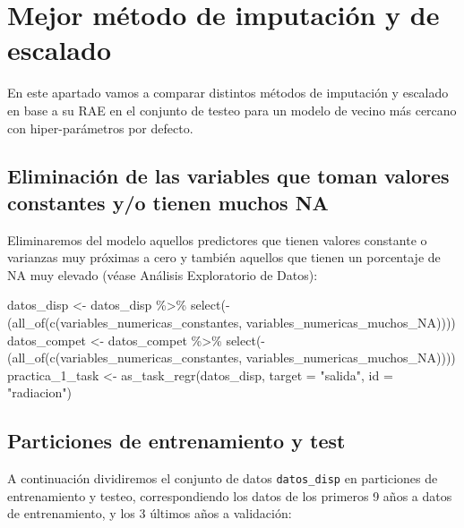 \documentclass[
  11pt,
  a4paper,
]{article}
\newenvironment{Shaded}{\begin{snugshade}}{\end{snugshade}}
\newcommand{\AttributeTok}[1]{\textcolor[rgb]{0.77,0.63,0.00}{#1}}
\newcommand{\FunctionTok}[1]{\textcolor[rgb]{0.00,0.00,0.00}{#1}}
\newcommand{\NormalTok}[1]{#1}
\newcommand{\OtherTok}[1]{\textcolor[rgb]{0.56,0.35,0.01}{#1}}
\newcommand{\SpecialCharTok}[1]{\textcolor[rgb]{0.00,0.00,0.00}{#1}}
\newcommand{\StringTok}[1]{\textcolor[rgb]{0.31,0.60,0.02}{#1}}
\begin{document}
\newpage
\section{Mejor método de imputación y de escalado}

En este apartado vamos a comparar distintos métodos de imputación y
escalado en base a su RAE en el conjunto de testeo para un modelo de
vecino más cercano con hiper-parámetros por defecto.

\subsection{Eliminación de las variables que toman valores constantes y/o tienen muchos NA}

Eliminaremos del modelo aquellos predictores que tienen valores
constante o varianzas muy próximas a cero y también aquellos que tienen
un porcentaje de NA muy elevado (véase Análisis Exploratorio de Datos):

\begin{Shaded}
\begin{Highlighting}[]
\NormalTok{datos\_disp }\OtherTok{\textless{}{-}}\NormalTok{ datos\_disp }\SpecialCharTok{\%\textgreater{}\%} \FunctionTok{select}\NormalTok{(}\SpecialCharTok{{-}}\NormalTok{(}\FunctionTok{all\_of}\NormalTok{(}\FunctionTok{c}\NormalTok{(variables\_numericas\_constantes, variables\_numericas\_muchos\_NA))))}
\NormalTok{datos\_compet }\OtherTok{\textless{}{-}}\NormalTok{ datos\_compet }\SpecialCharTok{\%\textgreater{}\%} \FunctionTok{select}\NormalTok{(}\SpecialCharTok{{-}}\NormalTok{(}\FunctionTok{all\_of}\NormalTok{(}\FunctionTok{c}\NormalTok{(variables\_numericas\_constantes, variables\_numericas\_muchos\_NA))))}
\NormalTok{practica\_1\_task }\OtherTok{\textless{}{-}} \FunctionTok{as\_task\_regr}\NormalTok{(datos\_disp, }\AttributeTok{target =} \StringTok{"salida"}\NormalTok{, }\AttributeTok{id =} \StringTok{"radiacion"}\NormalTok{)}
\end{Highlighting}
\end{Shaded}

\subsection{Particiones de entrenamiento y test}

A continuación dividiremos el conjunto de datos \texttt{datos\_disp} en
particiones de entrenamiento y testeo, correspondiendo los datos de los
primeros 9 años a datos de entrenamiento, y los 3 últimos años a
validación:
\end{document}
